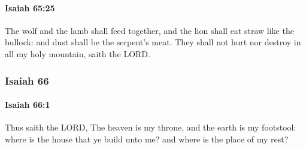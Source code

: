		\paragraph{Isaiah 65:25} %
			\label{ISAIAH-65-25}

			The wolf and the lamb shall feed together, and the lion shall eat straw like the bullock: and dust shall be the serpent's meat. They shall not hurt nor destroy in all my holy mountain, saith the LORD.

	\subsubsection{Isaiah 66} %
		\label{ISAIAH-66}

		\paragraph{Isaiah 66:1} %
			\label{ISAIAH-66-1}

			Thus saith the LORD, The heaven is my throne, and the earth is my footstool: where is the house that ye build unto me? and where is the place of my rest?

